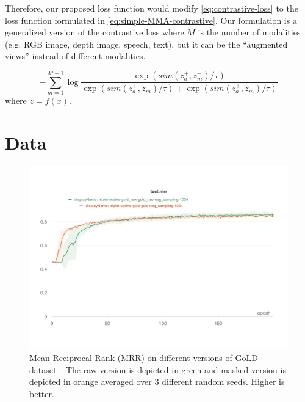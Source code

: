 Therefore, our proposed loss function would modify \cref{eq:contrastive-loss} to the loss function formulated in \cref{eq:simple-MMA-contrastive}. Our formulation is a generalized version of the contrastive loss where $M$ is the number of modalities (e.g. RGB image, depth image, speech, text), but it can be the ``augmented views'' instead of different modalities.


\begin{equation}\label{eq:simple-MMA-contrastive}
    -\sum_{m=1}^{M-1} \log \frac{\exp (sim(z_a^+ , z_{m}^{+})/ \tau) }{ \exp (sim(z_a^+ , z_{m}^{+}) / \tau) + \exp (sim(z_a^+, z_{m}^{-}) / \tau)}
\end{equation}
where $z = f(x)$.





\section{Data}

\begin{figure}[tbh]
\centering
\includegraphics[width=2.0\columnwidth]{Figures/raw-mask-test-mrr.pdf}
\caption{Mean Reciprocal Rank (MRR) on different versions of GoLD dataset~\cite{GoLD_UMBC}. The raw version is depicted in green and masked version is depicted in orange averaged over 3 different random seeds. Higher is better.}
\label{fig:mask-vs-raw}
\end{figure}


